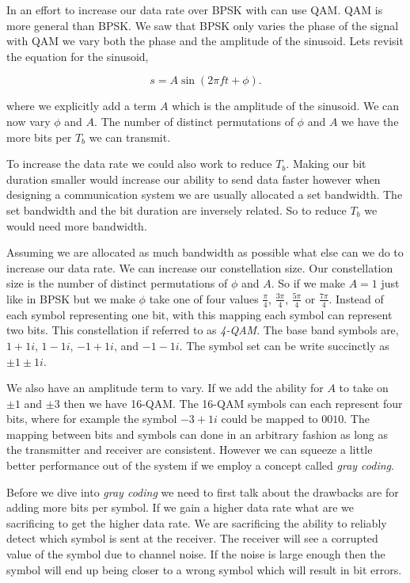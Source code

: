 In an effort to increase our data rate over \ac{BPSK} with can use \ac{QAM}. \ac{QAM} is more general than \ac{BPSK}. We saw that \ac{BPSK} only varies the phase of the signal with \ac{QAM} we vary both the phase and the amplitude of the sinusoid. Lets revisit the equation for the sinusoid,

\begin{equation}
s = A\sin\left(2\pi ft + \phi\right).
\end{equation}
	
\noindent

where we explicitly add a term $A$ which is the amplitude of the sinusoid. We can now vary $\phi$ and $A$. The number of distinct permutations of $\phi$ and $A$ we have the more bits per $T_b$ we can transmit.

To increase the data rate we could also work to reduce $T_b$. Making our bit duration smaller would increase our ability to send data faster however when designing a communication system we are usually allocated a set bandwidth. The set bandwidth and the bit duration are inversely related. So to reduce $T_b$ we would need more bandwidth.

Assuming we are allocated as much bandwidth as possible what else can we do to increase our data rate. We can increase our constellation size. Our constellation size is the number of distinct permutations of $\phi$ and $A$. So if we make $A=1$ just like in \ac{BPSK} but we make $\phi$ take one of four values $\frac{\pi}{4}$, $\frac{3\pi}{4}$, $\frac{5\pi}{4}$ or $\frac{7\pi}{4}$. Instead of each symbol representing one bit, with this mapping each symbol can represent two bits. This constellation if referred to as \emph{4-\ac{QAM}}. The base band symbols are, $1+1i$, $1-1i$, $-1+1i$, and $-1-1i$. The symbol set can be write succinctly as $\pm1\pm1i$.

We also have an amplitude term to vary. If we add the ability for $A$ to take on $\pm1$ and $\pm3$ then we have 16-\ac{QAM}. The 16-\ac{QAM} symbols can each represent four bits, where for example the symbol $-3+1i$ could be mapped to $0010$. The mapping between bits and symbols can done in an arbitrary fashion as long as the transmitter and receiver are consistent. However we can squeeze a little better performance out of the system if we employ a concept called \emph{gray coding}.

Before we dive into \emph{gray coding} we need to first talk about the drawbacks are for adding more bits per symbol. If we gain a higher data rate what are we sacrificing to get the higher data rate. We are sacrificing the ability to reliably detect which symbol is sent at the receiver. The receiver will see a corrupted value of the symbol due to channel noise. If the noise is large enough then the symbol will end up being closer to a wrong symbol which will result in bit errors.

